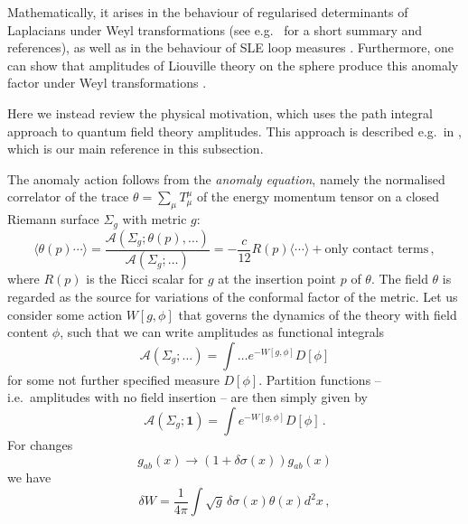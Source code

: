 \documentclass[11pt,a4paper]{article}
\numberwithin{equation}{section}
\newcommand{\one}{\mathbf{1}} %
\begin{document}
Mathematically, it arises in the behaviour of regularised determinants of Laplacians under Weyl transformations (see e.g.\ \cite[Sec.\,2.5.3]{Benoist:2014} for a short summary and references), as well as in the behaviour of SLE loop measures \cite[Thm.\,1.1]{Benoist:2014}. Furthermore, one can show that amplitudes of Liouville theory on the sphere produce this anomaly factor under Weyl transformations \cite[Thm.\,1.1]{Kupiainen:2019fhf}.

Here we instead review the physical motivation, which uses the path integral approach to quantum field theory amplitudes. This approach is described e.g.\ in \cite[Sec.\,13.3]{Zamolodchikov:2007}, which is our main reference in this subsection.

\smallskip
The anomaly action follows from the \emph{anomaly equation}, namely the normalised correlator of the trace $\theta = \sum_{\mu} T^\mu_\mu$ of the energy momentum tensor on a closed Riemann surface $\Sigma_g$ with metric $g$:
%
\begin{equation}\label{eq:WeylAnomaly}
    \langle \theta(p) \cdots \rangle = \frac{\mathcal{A}(\Sigma_g;\theta(p), \dots )}{\mathcal{A}(\Sigma_g;\dots )} = -\frac{c}{12} R(p) \langle \cdots \rangle + \text{only contact terms}\,,
\end{equation}
%
where $R(p)$ is the Ricci scalar for $g$ at the insertion point $p$ of $\theta$. The field $\theta$ is regarded as the source for variations of the conformal factor of the metric. Let us consider some action $W[g,\phi]$ that governs the dynamics of the theory with field content $\phi$, such that we can write amplitudes as functional integrals
%
\begin{equation}
    \mathcal{A}(\Sigma_g;\dots) = \int \dots e^{-W[g,\phi]} D[\phi] 
\end{equation}
%
for some not further specified measure $D[\phi]$. Partition functions -- i.e.\ amplitudes with no field insertion -- are then simply given by 
%
\begin{equation}
    \mathcal{A}(\Sigma_g;\one) = \int e^{-W[g,\phi]}D[\phi]\,.
\end{equation}
%
For changes 
%
\begin{equation}
    g_{ab}(x) \to \left(1+\delta \sigma(x)\right) g_{ab}(x)
\end{equation}
%
we have 
%
\begin{equation}\label{eq:ActionChange}
    \delta W = \frac{1}{4 \pi} \int \sqrt{g} \,\delta\sigma(x) \theta(x) d^2x\,,
\end{equation}
\end{document}
